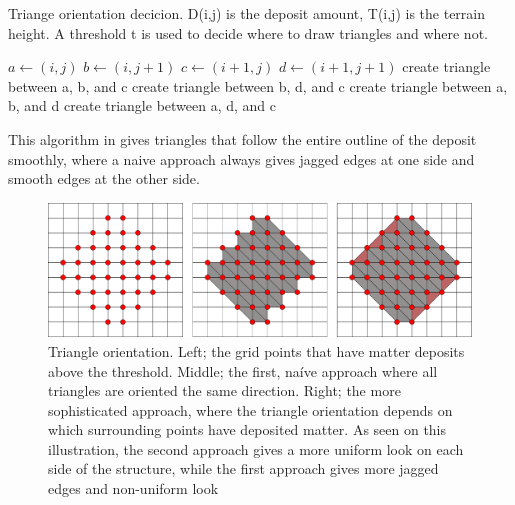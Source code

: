 \documentclass[a4paper,12pt]{report}
\newcommand{\And}{\textbf{ and }}
\begin{document}
\begin{algorithm}

 \caption{Triange orientation decicion. D(i,j) is the deposit amount, T(i,j) is the terrain height. A threshold t is used to decide where to draw triangles and where not.}
 \label{alg:triangle}
 \begin{algorithmic}
 
  \State $a \gets (i,j)$
  \State $b \gets (i,j+1)$
  \State $c \gets (i+1,j)$
  \State $d \gets (i+1, j+1)$
  \If {$D(c) > t \And D(b) > t$}
	\State create triangle between a, b, and c
     \EndIf
	\State create triangle between b, d, and c
     \EndIf
  \ElsIf {$D(a) > t \And D(d) > t$}
	\State create triangle between a, b, and d
     \EndIf
	\State create triangle between a, d, and c
     \EndIf
  \EndIf
  \EndFor
  
  \EndFor
  
 \end{algorithmic}

\end{algorithm}


  
This algorithm in gives triangles that follow the entire outline of the deposit smoothly, where a naive approach always gives jagged edges at one side and smooth edges at the other side.

\begin{figure}
 \includegraphics[width=\linewidth]{thesis/gridtrianglesall.pdf}
 \caption{Triangle orientation. Left; the grid points that have matter deposits above the threshold. Middle; the first, naíve approach where all triangles are oriented the same direction. Right; the more sophisticated approach, where the triangle orientation depends on which surrounding points have deposited matter. As seen on this illustration, the second approach gives a more uniform look on each side of the structure, while the first approach gives more jagged edges and non-uniform look}
\end{figure}
\end{document}
